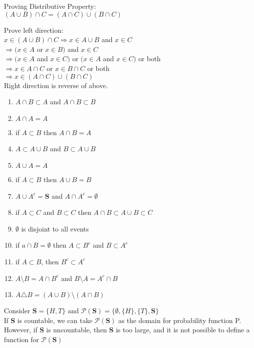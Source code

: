 \documentclass[14pt, oneside, letterpaper]{notes}
\begin{document}
\begin{remark}
	Proving Distributive Property: \\
	$(A \cup B) \cap C = (A \cap C) \cup (B \cap C)$ \\
	
	\begin{myproof}
		Prove left direction: \\
		$x \in (A \cup B) \cap C \Rightarrow x \in A \cup B$ and $x \in C$ \\
		$\Rightarrow (x \in A$ or $x \in B)$ and $x \in C$ \\
		$\Rightarrow (x \in A$ and $x \in C)$ 
		or $(x \in A$ and $x \in C)$ or both \\
		$\Rightarrow  x \in A \cap C$ or $x \in B \cap C$ or both \\
		$\Rightarrow  x \in (A\cap C) \cup (B \cap C)$ \\
		Right direction is reverse of above.
	\end{myproof}
\end{remark}

\begin{enumerate}
	\item $A \cap B \subset A$ and $A \cap B \subset B$
	\item $A \cap A = A$
	\item if $A \subset B $ then $A \cap B = A $
	\item $A \subset A \cup B$ and $B \subset A \cup B$
	\item $A \cup A = A$
	\item if $ A \subset B$ then $A \cup B = B$
	\item $A \cup A^c = \textbf{S}$ and $A \cap A^c = \emptyset$
	\item if $A \subset C$ and $B \subset C$ 
	then $A \cap B \subset A \cup B \subset C$
	\item $\emptyset$ is disjoint to all events
	\item if $a \cap B = \emptyset$ then $A \subset B^c$
	and $B \subset A^c$
	\item if $A \subset B$, then $B^c \subset A^c$
	\item $A \setminus B = A \cap B^c$ and $B \setminus A = A^c \cap B$
	\item $A \triangle B = (A \cup B) \setminus (A \cap B) $
\end{enumerate}

%
%

\begin{remark}
	Consider $\textbf{S} = \{H, T\}$ and $\mathscr{P}(\textbf{S}) = \{\emptyset, 
	\{H\}, \{T\}, \textbf{S} \}$ \\
	\indent If \textbf{S} is countable, we can take $\mathscr{P}(\textbf{S}) $
	as the domain for probability function P.  \\
	\indent However, if \textbf{S} is uncountable, then \textbf{S} is too large, 
	and it is not possible to define a function for $\mathscr{P}(\textbf{S}) $
\end{remark}
\end{document}
